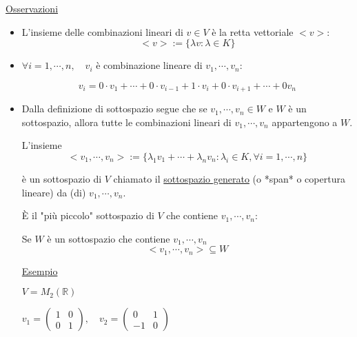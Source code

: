 \documentclass{article}
\newcommand{\ul}[1]{\underline{#1}}
\newcommand{\R}{\mathbb{R}}
\begin{document}
\ul{Osservazioni}
\begin{itemize}
	\item L'insieme delle combinazioni lineari di $v\in V$ è la retta vettoriale $<v>$:
	      $$<v>:=\{\lambda v:\lambda\in K\}$$
	\item $\forall i=1,\cdots,n,\quad v_i$ è combinazione lineare di $v_1,\cdots,v_n$:

	      $$v_i=0\cdot v_1+\cdots+0\cdot v_{i-1}+1\cdot v_i+0\cdot v_{i+1}+\cdots+0v_n$$
	\item Dalla definizione di sottospazio segue che se $v_1,\cdots,v_n\in W$ e $W$ è un sottospazio, allora tutte le combinazioni lineari di $v_1,\cdots,v_n$ appartengono a $W$.

	      L'insieme
	      $$<v_1,\cdots,v_n>:=\{\lambda_1v_1+\cdots+\lambda_nv_n:\lambda_i\in K,\forall i=1,\cdots,n\}$$

	      è un sottospazio di $V$ chiamato il \ul{sottospazio generato} (o *span* o copertura lineare) da (di) $v_1,\cdots,v_n$.

	      È il "più piccolo" sottospazio di $V$ che contiene $v_1,\cdots,v_n$:

	      Se $W$ è un sottospazio che contiene $v_1,\cdots,v_n$
	      $$<v_1,\cdots,v_n>\subseteq W$$

	      \ul{Esempio}

	      $V=M_2(\R)$

	      $v_1=\begin{pmatrix}1&0\\0&1\end{pmatrix},\quad v_2=\begin{pmatrix}0&1\\-1&0\end{pmatrix}$


\end{itemize}
\end{document}
